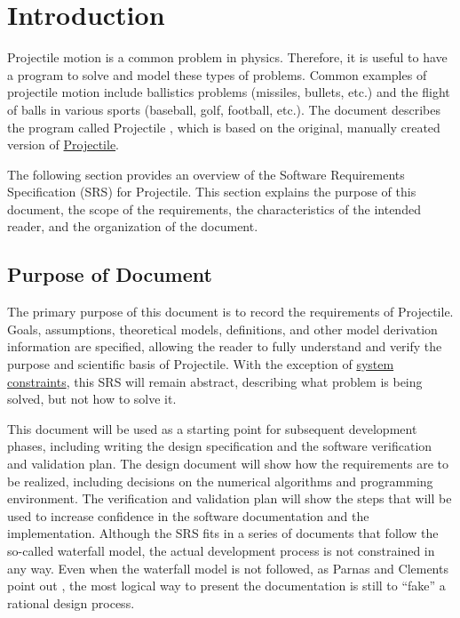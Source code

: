 \documentclass[12pt]{article}
\begin{document}
\section{Introduction}
\label{Sec:Intro}
Projectile motion is a common problem in physics. Therefore, it is useful to have a program to solve and model these types of problems. Common examples of projectile motion include ballistics problems (missiles, bullets, etc.) and the flight of balls in various sports (baseball, golf, football, etc.). The document describes the program called Projectile , which is based on the original, manually created version of \hyperref{https://github.com/smiths/caseStudies/tree/master/CaseStudies/projectile}{}{}{Projectile}.

The following section provides an overview of the Software Requirements Specification (SRS) for Projectile. This section explains the purpose of this document, the scope of the requirements, the characteristics of the intended reader, and the organization of the document.

\subsection{Purpose of Document}
\label{Sec:DocPurpose}
The primary purpose of this document is to record the requirements of Projectile. Goals, assumptions, theoretical models, definitions, and other model derivation information are specified, allowing the reader to fully understand and verify the purpose and scientific basis of Projectile. With the exception of \hyperref[Sec:SysConstraints]{system constraints}, this SRS will remain abstract, describing what problem is being solved, but not how to solve it.

This document will be used as a starting point for subsequent development phases, including writing the design specification and the software verification and validation plan. The design document will show how the requirements are to be realized, including decisions on the numerical algorithms and programming environment. The verification and validation plan will show the steps that will be used to increase confidence in the software documentation and the implementation. Although the SRS fits in a series of documents that follow the so-called waterfall model, the actual development process is not constrained in any way. Even when the waterfall model is not followed, as Parnas and Clements point out \cite{parnasClements1986}, the most logical way to present the documentation is still to ``fake'' a rational design process.
\end{document}
